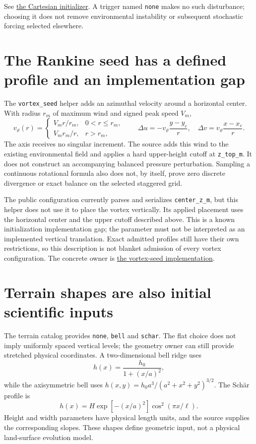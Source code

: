 See \href{../src/core/orchestration/dynamics/initial_conditions_cartesian.cpp}{the
Cartesian initializer}. A trigger named \texttt{none} makes no such disturbance;
choosing it does not remove environmental instability or subsequent stochastic
forcing selected elsewhere.

\section{The Rankine seed has a defined profile and an implementation gap}

The \texttt{vortex\_seed} helper adds an azimuthal velocity around a horizontal
center. With radius $r_m$ of maximum wind and signed peak speed $V_m$,
\[
 v_\vartheta(r)=\begin{cases}
 V_m r/r_m,&0<r\le r_m,\\
 V_m r_m/r,&r>r_m,
 \end{cases}
 \qquad
 \Delta u=-v_\vartheta\frac{y-y_c}{r},\quad
 \Delta v=v_\vartheta\frac{x-x_c}{r}.
\]
The axis receives no singular increment. The source adds this wind to the
existing environmental field and applies a hard upper-height cutoff at
\texttt{z\_top\_m}. It does not construct an accompanying balanced pressure
perturbation. Sampling a continuous rotational formula also does not, by itself,
prove zero discrete divergence or exact balance on the selected staggered grid.

The public configuration currently parses and serializes
\texttt{center\_z\_m}, but this helper does not use it to place the vortex
vertically. Its applied placement uses the horizontal center and the upper
cutoff described above. This is a known initialization implementation gap;
the parameter must not be interpreted as an implemented vertical translation.
Exact admitted profiles still have their own restrictions, so this description
is not blanket admission of every vortex configuration. The concrete owner is
\href{../src/init/trigger/sources/vortex_seed.cpp}{the vortex-seed implementation}.

\section{Terrain shapes are also initial scientific inputs}

The terrain catalog provides \texttt{none}, \texttt{bell} and \texttt{schar}.
The flat choice does not imply uniformly spaced vertical levels; the geometry
owner can still provide stretched physical coordinates. A two-dimensional bell
ridge uses
\[
 h(x)=\frac{h_0}{1+(x/a)^2},
\]
while the axisymmetric bell uses
$h(x,y)=h_0a^3/(a^2+x^2+y^2)^{3/2}$. The Sch\"ar profile is
\[
 h(x)=H\exp[-(x/a)^2]\cos^2(\pi x/\ell).
\]
Height and width parameters have physical length units, and the source supplies
the corresponding slopes. These shapes define geometric input, not a physical
land-surface evolution model.

